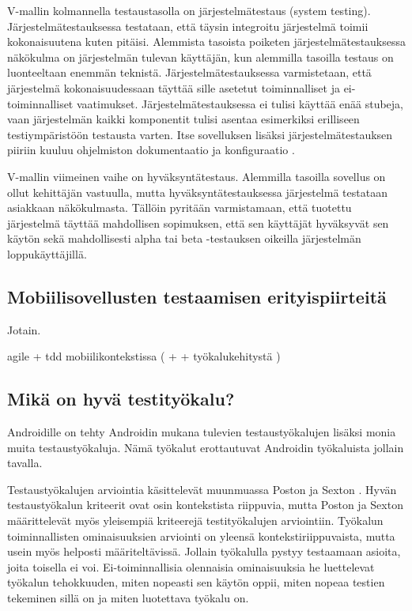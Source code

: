 V-mallin kolmannella testaustasolla on järjestelmätestaus (system testing). Järjestelmätestauksessa testataan, että täysin integroitu järjestelmä toimii kokonaisuutena kuten pitäisi. Alemmista tasoista poiketen järjestelmätestauksessa näkökulma on järjestelmän tulevan käyttäjän, kun alemmilla tasoilla testaus on luonteeltaan enemmän teknistä. Järjestelmätestauksessa varmistetaan, että järjestelmä kokonaisuudessaan täyttää sille asetetut toiminnalliset ja ei-toiminnalliset vaatimukset. Järjestelmätestauksessa ei tulisi käyttää enää stubeja, vaan järjestelmän kaikki komponentit tulisi asentaa esimerkiksi erilliseen testiympäristöön testausta varten. Itse sovelluksen lisäksi järjestelmätestauksen piiriin kuuluu ohjelmiston dokumentaatio ja konfiguraatio \cite[58-61]{testing_foundations}.

V-mallin viimeinen vaihe on hyväksyntätestaus. Alemmilla tasoilla sovellus on ollut kehittäjän vastuulla, mutta hyväksyntätestauksessa järjestelmä testataan asiakkaan näkökulmasta. Tällöin pyritään varmistamaan, että tuotettu järjestelmä täyttää mahdollisen sopimuksen, että sen käyttäjät hyväksyvät sen käytön sekä mahdollisesti alpha tai beta -testauksen oikeilla järjestelmän loppukäyttäjillä.\cite[62-]{testing_foundations}

\subsection{Mobiilisovellusten testaamisen erityispiirteitä}

Jotain.

agile + tdd mobiilikontekstissa (\cite{mobiled} + \cite{abrahamsson04} +  työkalukehitystä \cite{spataru10})

\subsection{Mikä on hyvä testityökalu?}

Androidille on tehty Androidin mukana tulevien testaustyökalujen lisäksi monia muita testaustyökaluja. Nämä työkalut erottautuvat Androidin työkaluista jollain tavalla.

Testaustyökalujen arviointia käsittelevät muunmuassa Poston ja Sexton \cite{poston92}. Hyvän testaustyökalun kriteerit ovat osin kontekstista riippuvia, mutta Poston ja Sexton määrittelevät myös yleisempiä kriteerejä testityökalujen arviointiin. Työkalun toiminnallisten ominaisuuksien arviointi on yleensä kontekstiriippuvaista, mutta usein myös helposti määriteltävissä. Jollain työkalulla pystyy testaamaan asioita, joita toisella ei voi. Ei-toiminnallisia olennaisia ominaisuuksia he luettelevat työkalun tehokkuuden, miten nopeasti sen käytön oppii, miten nopeaa testien tekeminen sillä on ja miten luotettava työkalu on.


